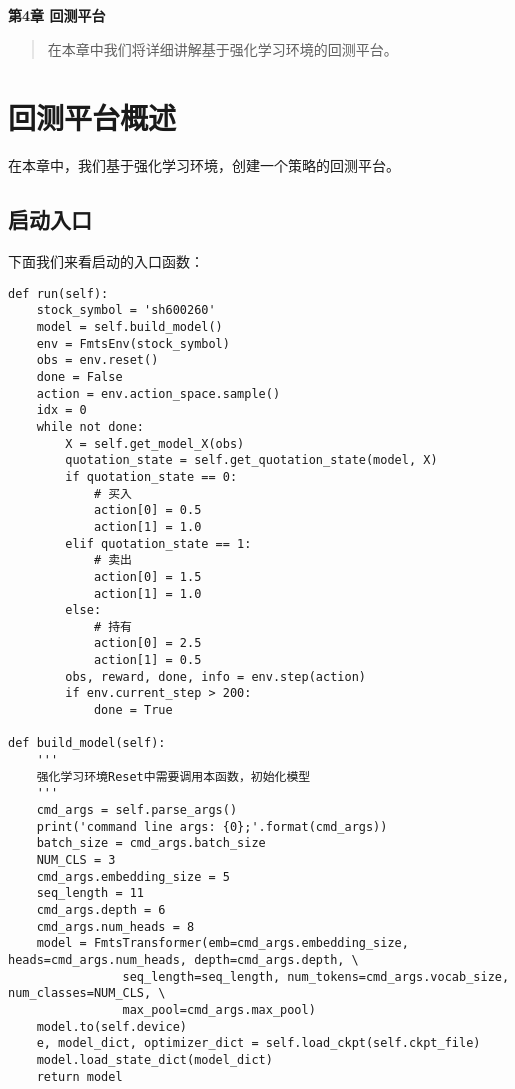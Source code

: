 \newpage
\maketitle
\begin{center}
\Large \textbf{第4章 回测平台} \quad 
\end{center}
\begin{abstract}
在本章中我们将详细讲解基于强化学习环境的回测平台。
\end{abstract}
\section{回测平台概述}
在本章中，我们基于强化学习环境，创建一个策略的回测平台。
\subsection{启动入口}
下面我们来看启动的入口函数：
\begin{lstlisting}
def run(self):
    stock_symbol = 'sh600260'
    model = self.build_model()
    env = FmtsEnv(stock_symbol)
    obs = env.reset()        
    done = False 
    action = env.action_space.sample() 
    idx = 0
    while not done:
        X = self.get_model_X(obs)
        quotation_state = self.get_quotation_state(model, X)
        if quotation_state == 0:
            # 买入
            action[0] = 0.5
            action[1] = 1.0
        elif quotation_state == 1:
            # 卖出
            action[0] = 1.5
            action[1] = 1.0
        else:
            # 持有
            action[0] = 2.5
            action[1] = 0.5
        obs, reward, done, info = env.step(action)
        if env.current_step > 200:
            done = True

def build_model(self):
    '''
    强化学习环境Reset中需要调用本函数，初始化模型
    '''
    cmd_args = self.parse_args()
    print('command line args: {0};'.format(cmd_args))
    batch_size = cmd_args.batch_size
    NUM_CLS = 3
    cmd_args.embedding_size = 5
    seq_length = 11
    cmd_args.depth = 6
    cmd_args.num_heads = 8
    model = FmtsTransformer(emb=cmd_args.embedding_size, heads=cmd_args.num_heads, depth=cmd_args.depth, \
                seq_length=seq_length, num_tokens=cmd_args.vocab_size, num_classes=NUM_CLS, \
                max_pool=cmd_args.max_pool)
    model.to(self.device)
    e, model_dict, optimizer_dict = self.load_ckpt(self.ckpt_file)
    model.load_state_dict(model_dict)
    return model
\end{lstlisting}
